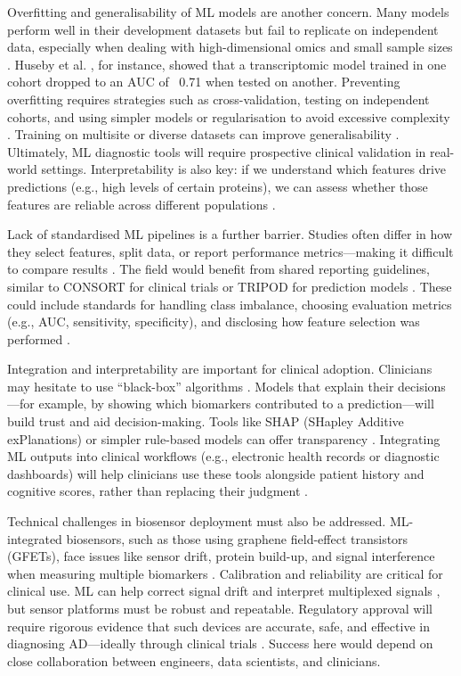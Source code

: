 \documentclass[a4paper,12pt]{article}
\begin{document}
Overfitting and generalisability of ML models are another concern. Many models perform well in their development datasets but fail to replicate on independent data, especially when dealing with high-dimensional omics and small sample sizes \cite{varoquaux2018cross}. Huseby et al. \cite{huseby2022blood}, for instance, showed that a transcriptomic model trained in one cohort dropped to an AUC of ~0.71 when tested on another. Preventing overfitting requires strategies such as cross-validation, testing on independent cohorts, and using simpler models or regularisation to avoid excessive complexity \cite{varoquaux2018cross}. Training on multisite or diverse datasets can improve generalisability \cite{bron2021cross}. Ultimately, ML diagnostic tools will require prospective clinical validation in real-world settings. Interpretability is also key: if we understand which features drive predictions (e.g., high levels of certain proteins), we can assess whether those features are reliable across different populations \cite{doshi2017towards}.

Lack of standardised ML pipelines is a further barrier. Studies often differ in how they select features, split data, or report performance metrics—making it difficult to compare results \cite{lan2024analysis}. The field would benefit from shared reporting guidelines, similar to CONSORT for clinical trials or TRIPOD for prediction models \cite{collins2015transparent}. These could include standards for handling class imbalance, choosing evaluation metrics (e.g., AUC, sensitivity, specificity), and disclosing how feature selection was performed \cite{martin2019evaluating}.

Integration and interpretability are important for clinical adoption. Clinicians may hesitate to use “black-box” algorithms \cite{doshi2017towards}. Models that explain their decisions—for example, by showing which biomarkers contributed to a prediction—will build trust and aid decision-making. Tools like SHAP (SHapley Additive exPlanations) or simpler rule-based models can offer transparency \cite{lundberg2017unified}. Integrating ML outputs into clinical workflows (e.g., electronic health records or diagnostic dashboards) will help clinicians use these tools alongside patient history and cognitive scores, rather than replacing their judgment \cite{martin2019evaluating}.

Technical challenges in biosensor deployment must also be addressed. ML-integrated biosensors, such as those using graphene field-effect transistors (GFETs), face issues like sensor drift, protein build-up, and signal interference when measuring multiple biomarkers \cite{krishnan2023graphene}. Calibration and reliability are critical for clinical use. ML can help correct signal drift and interpret multiplexed signals \cite{bhaiyya2024role}, but sensor platforms must be robust and repeatable. Regulatory approval will require rigorous evidence that such devices are accurate, safe, and effective in diagnosing AD—ideally through clinical trials \cite{martin2019evaluating}. Success here would depend on close collaboration between engineers, data scientists, and clinicians.
\end{document}
